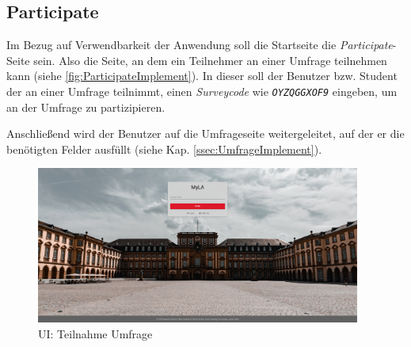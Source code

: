 
\subsection{Participate}
Im Bezug auf Verwendbarkeit der Anwendung soll die Startseite die \emph{Participate}-Seite sein.
Also die Seite, an dem ein Teilnehmer an einer Umfrage teilnehmen kann (siehe \vref{fig:ParticipateImplement}). \newline 
In dieser soll der Benutzer bzw. Student der an einer Umfrage teilnimmt, einen \emph{Surveycode} wie \zb \emph{\texttt{OYZQGGXOF9}} eingeben, um an der Umfrage zu partizipieren. 

Anschließend wird der Benutzer auf die Umfrageseite weitergeleitet, auf der er die benötigten Felder ausfüllt (siehe Kap. \vref{ssec:UmfrageImplement}).

\begin{figure}[hp]
	\centering
	\includegraphics[width=0.95\textwidth, keepaspectratio]{img/client/Participate.png}
	\captionsetup{justification=centering, format=plain}
	\caption[\acf{UI}: Teilnahme Umfrage]{\acf{UI}: Teilnahme Umfrage \\ \quelleScreenshot}
	\label{fig:ParticipateImplement}
\end{figure}